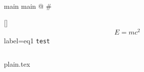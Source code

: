 \documentclass[10pt]{article}
\begin{document}
main main
@
#

\ref{}
\begin{align}
E = mc^{2}
\end{align}
label={eq1}
\lstinline[showlines]{test}
\begin{lstlisting}[print]
\end{lstlisting}


{plain.tex}
\end{document}
